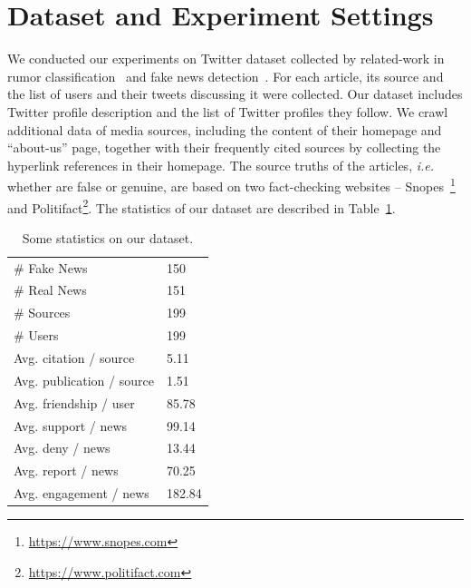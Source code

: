 \documentclass[fyp]{socreport}
\theoremstyle{definition}
\theoremstyle{hypothesis}
\begin{document}
\section{Dataset and Experiment Settings}
We conducted our experiments on Twitter dataset collected by related-work in rumor classification~\cite{ma2016detecting} and fake news detection~\cite{shu2018fakenewsnet}. For each article, its source and the list of users and their tweets discussing it were collected. Our dataset includes Twitter profile description and the list of Twitter profiles they follow. We crawl additional data of media sources, including the content of their homepage and ``about-us'' page, together with their frequently cited sources by collecting the hyperlink references in their homepage. The source truths of the articles, \textit{i.e.} whether are false or genuine, are based on two fact-checking websites -- Snopes~\footnote{\url{https://www.snopes.com}} and Politifact\footnote{\url{https://www.politifact.com}}. The statistics of our dataset are described in Table~\ref{table:dataset_statistics}.

\begin{table}[ht]
    \centering
    \begin{tabular}{l | l} \hline
        \# Fake News & 150 \\
        \# Real News & 151 \\
        \# Sources & 199 \\
        \# Users & 199 \\ \hline
        Avg. citation / source & 5.11 \\
        Avg. publication / source & 1.51 \\
        Avg. friendship / user & 85.78 \\
        Avg. support / news & 99.14 \\
        Avg. deny / news & 13.44 \\
        Avg. report / news & 70.25 \\
        Avg. engagement / news & 182.84 \\ \hline
    \end{tabular}
    \caption{Some statistics on our dataset.}
    \label{table:dataset_statistics}
\end{table}
\end{document}
